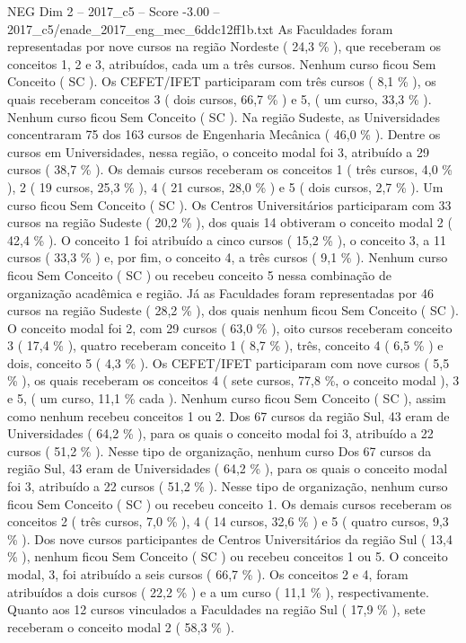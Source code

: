 \begin{textsample}{NEG Dim 2 – 2017\_c5 – Score -3.00 – 2017\_c5/enade\_2017\_eng\_mec\_6ddc12ff1b.txt}
As Faculdades foram representadas por nove cursos na região Nordeste ( 24,3 \% ), que receberam os conceitos 1, 2 e 3, atribuídos, cada um a três cursos.
Nenhum curso ficou Sem Conceito ( SC ).
Os CEFET/IFET participaram com três cursos ( 8,1 \% ), os quais receberam conceitos 3 ( dois cursos, 66,7 \% ) e 5, ( um curso, 33,3 \% ).
Nenhum curso ficou Sem Conceito ( SC ).
Na região Sudeste, as Universidades concentraram 75 dos 163 cursos de Engenharia Mecânica ( 46,0 \% ).
Dentre os cursos em Universidades, nessa região, o conceito modal foi 3, atribuído a 29 cursos ( 38,7 \% ).
Os demais cursos receberam os conceitos 1 ( três cursos, 4,0 \% ), 2 ( 19 cursos, 25,3 \% ), 4 ( 21 cursos, 28,0 \% ) e 5 ( dois cursos, 2,7 \% ).
Um curso ficou Sem Conceito ( SC ).
Os Centros Universitários participaram com 33 cursos na região Sudeste ( 20,2 \% ), dos quais 14 obtiveram o conceito modal 2 ( 42,4 \% ).
O conceito 1 foi atribuído a cinco cursos ( 15,2 \% ), o conceito 3, a 11 cursos ( 33,3 \% ) e, por fim, o conceito 4, a três cursos ( 9,1 \% ).
Nenhum curso ficou Sem Conceito ( SC ) ou recebeu conceito 5 nessa combinação de organização acadêmica e região.
Já as Faculdades foram representadas por 46 cursos na região Sudeste ( 28,2 \% ), dos quais nenhum ficou Sem Conceito ( SC ).
O conceito modal foi 2, com 29 cursos ( 63,0 \% ), oito cursos receberam conceito 3 ( 17,4 \% ), quatro receberam conceito 1 ( 8,7 \% ), três, conceito 4 ( 6,5 \% ) e dois, conceito 5 ( 4,3 \% ).
Os CEFET/IFET participaram com nove cursos ( 5,5 \% ), os quais receberam os conceitos 4 ( sete cursos, 77,8 \%, o conceito modal ), 3 e 5, ( um curso, 11,1 \% cada ).
Nenhum curso ficou Sem Conceito ( SC ), assim como nenhum recebeu conceitos 1 ou 2.
Dos 67 cursos da região Sul, 43 eram de Universidades ( 64,2 \% ), para os quais o conceito modal foi 3, atribuído a 22 cursos ( 51,2 \% ).
Nesse tipo de organização, nenhum curso Dos 67 cursos da região Sul, 43 eram de Universidades ( 64,2 \% ), para os quais o conceito modal foi 3, atribuído a 22 cursos ( 51,2 \% ).
Nesse tipo de organização, nenhum curso ficou Sem Conceito ( SC ) ou recebeu conceito 1.
Os demais cursos receberam os conceitos 2 ( três cursos, 7,0 \% ), 4 ( 14 cursos, 32,6 \% ) e 5 ( quatro cursos, 9,3 \% ).
Dos nove cursos participantes de Centros Universitários da região Sul ( 13,4 \% ), nenhum ficou Sem Conceito ( SC ) ou recebeu conceitos 1 ou 5.
O conceito modal, 3, foi atribuído a seis cursos ( 66,7 \% ).
Os conceitos 2 e 4, foram atribuídos a dois cursos ( 22,2 \% ) e a um curso ( 11,1 \% ), respectivamente.
Quanto aos 12 cursos vinculados a Faculdades na região Sul ( 17,9 \% ), sete receberam o conceito modal 2 ( 58,3 \% ).

\end{textsample}
